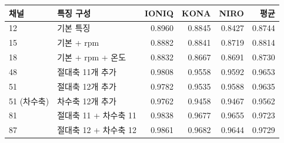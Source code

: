 \begin{tabular}{llrrrr}
\toprule
채널 & 특징 구성 & IONIQ & KONA & NIRO & 평균 \\
\midrule
12 & 기본 특징 & 0.8960 & 0.8845 & 0.8427 & 0.8744 \\
15 & 기본 + rpm & 0.8882 & 0.8841 & 0.8719 & 0.8814 \\
18 & 기본 + rpm + 온도 & 0.8832 & 0.8667 & 0.8691 & 0.8730 \\
48 & 절대축 11개 추가 & 0.9808 & 0.9558 & 0.9592 & 0.9653 \\
51 & 절대축 12개 추가 & 0.9782 & 0.9535 & 0.9588 & 0.9635 \\
51 (차수축) & 차수축 12개 추가 & 0.9762 & 0.9458 & 0.9467 & 0.9562 \\
81 & 절대축 11 + 차수축 11 & 0.9838 & 0.9677 & 0.9655 & 0.9723 \\
87 & 절대축 12 + 차수축 12 & 0.9861 & 0.9682 & 0.9644 & 0.9729 \\
\bottomrule
\end{tabular}
